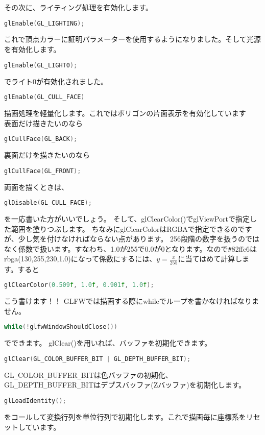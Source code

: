 \documentclass[a4paper,titlepage]{jsarticle}
\begin{document}
その次に、ライティング処理を有効化します。
\begin{lstlisting}[language=C++]
glEnable(GL_LIGHTING);
\end{lstlisting}
これで頂点カラーに証明パラメーターを使用するようになりました。そして光源を有効化します。
\begin{lstlisting}[language=C++]
glEnable(GL_LIGHT0);
\end{lstlisting}
でライト0が有効化されました。
\begin{lstlisting}[language=C++]
glEnable(GL_CULL_FACE)
\end{lstlisting}
描画処理を軽量化します。これではポリゴンの片面表示を有効化しています\\
表面だけ描きたいのなら
\begin{lstlisting}[language=C++]
glCullFace(GL_BACK);
\end{lstlisting}
裏面だけを描きたいのなら
\begin{lstlisting}[language=C++]
glCullFace(GL_FRONT);
\end{lstlisting}
両面を描くときは、
\begin{lstlisting}[language=C++]
glDisable(GL_CULL_FACE);
\end{lstlisting}
を一応書いた方がいいでしょう。
そして、glClearColor()でglViewPortで指定した範囲を塗りつぶします。
ちなみにglClearColorはRGBAで指定できるのですが、少し気を付けなければならない点があります。
256段階の数字を扱うのではなく係数で扱います。すなわち、1.0が255で0.0が0となります。なので\verb|#|82ffe6はrbga(130,255,230,1.0)になって係数にするには、$ y = \frac{x}{255} $に当てはめて計算します。すると
\begin{lstlisting}[language=C++]
glClearColor(0.509f, 1.0f, 0.901f, 1.0f);
\end{lstlisting}
こう書けます！！
GLFWでは描画する際にwhileでループを書かなければなりません。
\begin{lstlisting}[language=C++]
while(!glfwWindowShouldClose())
\end{lstlisting}
でできます。
glClear()を用いれば、バッファを初期化できます。
\begin{lstlisting}[language=C++]
glClear(GL_COLOR_BUFFER_BIT | GL_DEPTH_BUFFER_BIT);
\end{lstlisting}
GL\verb|_|COLOR\verb|_|BUFFER\verb|_|BITは色バッファの初期化、GL\verb|_|DEPTH\verb|_|BUFFER\verb|_|BITはデプスバッファ(Zバッファ)を初期化します。
\begin{lstlisting}[language=C++]
glLoadIdentity();
\end{lstlisting}
をコールして変換行列を単位行列で初期化します。これで描画毎に座標系をリセットしています。
\end{document}
